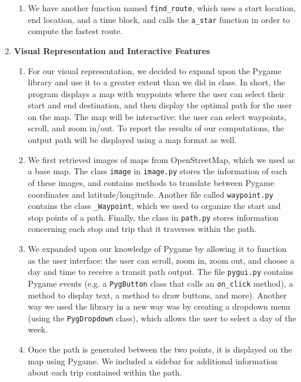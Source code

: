 \documentclass[fontsize=11pt]{article}
\begin{document}
\begin{enumerate}
\begin{enumerate}
            \item We have another function named \texttt{find\_route}, which uses a start location, end location, and a time block, and calls the \texttt{a\_star} function in order to compute the fastest route. \\

        \end{enumerate}

        \item \textbf{Visual Representation and Interactive Features}
        \begin{enumerate}
            \item For our visual representation, we decided to expand upon the Pygame library and use it to a greater extent than we did in class. In short, the program displays a map with waypoints where the user can select their start and end destination, and then display the optimal path for the user on the map. The map will be interactive: the user can select waypoints, scroll, and zoom in/out. To report the results of our computations, the output path will be displayed using a map format as well. \\

            \item We first retrieved images of maps from OpenStreetMap, which we used as a base map. The class \texttt{image} in \texttt{image.py} stores the information of each of these images, and contains methods to translate between Pygame coordinates and latitude/longitude. Another file called \texttt{waypoint.py} contains the class \texttt{\_Waypoint}, which we used to organize the start and stop points of a path. Finally, the class  in \texttt{path.py} stores information concerning each stop and trip that it traverses within the path. \\

            \item We expanded upon our knowledge of Pygame by allowing it to function as the user interface: the user can scroll, zoom in, zoom out, and choose a day and time to receive a transit path output. The file \texttt{pygui.py} contains Pygame events (e.g. a \texttt{PygButton} class that calls an \texttt{on\_click} method), a method to display text, a method to draw buttons, and more). Another way we used the library in a new way was by creating a dropdown menu (using the \texttt{PygDropdown} class), which allows the user to select a day of the week. \\

            \item Once the path is generated between the two points, it is displayed on the map using Pygame. We included a sidebar for additional information about each trip contained within the path.

        \end{enumerate}

    \end{enumerate}
\end{document}

